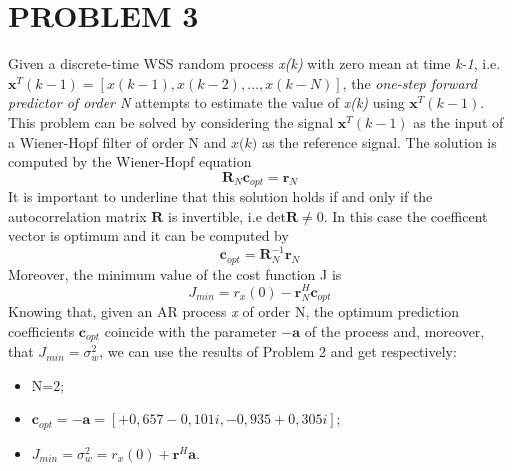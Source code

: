 \documentclass[a4paper,11pt,openright,twoside]{report}
\begin{document}
\section*{PROBLEM 3}
Given a discrete-time WSS random process \textit{x(k)} with zero mean at time \textit{k-1}, i.e. $\mathbf{x}^T(k-1) = [x(k-1), x(k-2), \dots, x(k-N)] $, the \textit{one-step forward predictor of order N} attempts to estimate the value of \textit{x(k)} using $\mathbf{x}^T(k-1)$. This problem can be solved by considering the signal $\mathbf{x}^T(k-1)$ as the input of a Wiener-Hopf filter of order N and $\textit{x(k)}$ as the reference signal. The solution is computed by the Wiener-Hopf equation 
\begin{equation*}
\mathbf{R}_N\mathbf{c}_{opt} = \mathbf{r}_N
\end{equation*}
It is important to underline that this solution holds if and only if the autocorrelation matrix $\mathbf{R}$ is invertible, i.e $\text{det}\mathbf{R}\ne0$. In this case the coefficent vector is optimum and it can be computed by
\begin{equation*}
\mathbf{c}_{opt} = \mathbf{R}^{-1}_N\mathbf{r}_N
\end{equation*}
Moreover, the minimum value of the cost function J is
\begin{equation*}
J_{min} = r_x(0)-\mathbf{r}_N^H\mathbf{c}_{opt}
\end{equation*}
Knowing that, given an AR process \textit{x} of order N, the optimum prediction coefficients $\mathbf{c}_{opt}$ coincide with the parameter $-\mathbf{a}$ of the process and, moreover, that $J_{min}=\sigma_w^2$, we can use the results of Problem 2 and get respectively:

\begin{itemize}
	\item N=2;
	\item $\mathbf{c}_{opt} = - \mathbf{a} = [+0,657 - 0,101i, -0,935 + 0,305i]$; 
	\item $J_{min}= \sigma_w^2 = r_x(0)+\mathbf{r}^H\mathbf{a}$.
\end{itemize}
\end{document}
